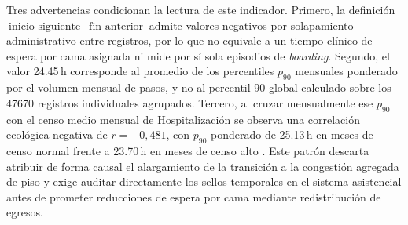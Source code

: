 Tres advertencias condicionan la lectura de este indicador. Primero, la definición $\text{inicio\_siguiente} - \text{fin\_anterior}$ admite valores negativos por solapamiento administrativo entre registros, por lo que no equivale a un tiempo clínico de espera por cama asignada ni mide por sí sola episodios de \textit{boarding}. Segundo, el valor \num{24,45}\,h corresponde al promedio de los percentiles $p_{90}$ mensuales ponderado por el volumen mensual de pasos, y no al percentil 90 global calculado sobre los \num{47670} registros individuales agrupados. Tercero, al cruzar mensualmente ese $p_{90}$ con el censo medio mensual de Hospitalización se observa una correlación ecológica negativa de $r = -0{,}481$, con $p_{90}$ ponderado de \num{25,13}\,h en meses de censo normal frente a \num{23,70}\,h en meses de censo alto \parencite{mediflow2026optimizacion}. Este patrón descarta atribuir de forma causal el alargamiento de la transición a la congestión agregada de piso y exige auditar directamente los sellos temporales en el sistema asistencial antes de prometer reducciones de espera por cama mediante redistribución de egresos.
